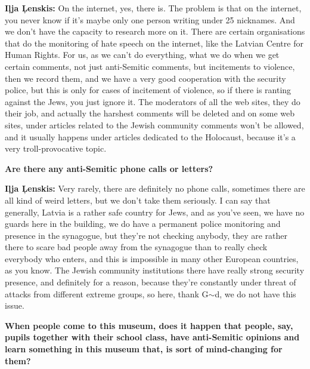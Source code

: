 \textbf{Iļja Ļenskis:} On the internet, yes, there is. The problem is that on the internet, you never know if it's maybe only one person writing under 25 nicknames. And we don’t have the capacity to research more on it. There are certain organisations that do the monitoring of hate speech on the internet, like the Latvian Centre for Human Rights. For us, as we can’t do everything, what we do when we get certain comments, not just anti-Semitic comments, but incitements to violence, then we record them, and we have a very good cooperation with the security police, but this is only for cases of incitement of violence, so if there is ranting against the Jews, you just ignore it. The moderators of all the web sites, they do their job, and actually the harshest comments will be deleted and on some web sites, under articles related to the Jewish community comments won't be allowed, and it usually happens under articles dedicated to the Holocaust, because it's a very troll-provocative topic.

\textbf{Are there any anti-Semitic phone calls or letters?} 

\textbf{Iļja Ļenskis:} Very rarely, there are definitely no phone calls, sometimes there are all kind of weird letters, but we don’t take them seriously. I can say that generally, Latvia is a rather safe country for Jews, and as you’ve seen, we have no guards here in the building, we do have a permanent police monitoring and presence in the synagogue, but they’re not checking anybody, they are rather there to scare bad people away from the synagogue than to really check everybody who enters, and this is impossible in many other European countries, as you know. The Jewish community institutions there have really strong security presence, and definitely for a reason, because they’re constantly under threat of attacks from different extreme groups, so here, thank G$\sim$d, we do not have this issue.

\textbf{When people come to this museum, does it happen that people, say, pupils together with their school class, have anti-Semitic opinions and learn something in this museum that, is sort of mind-changing for them?} 

